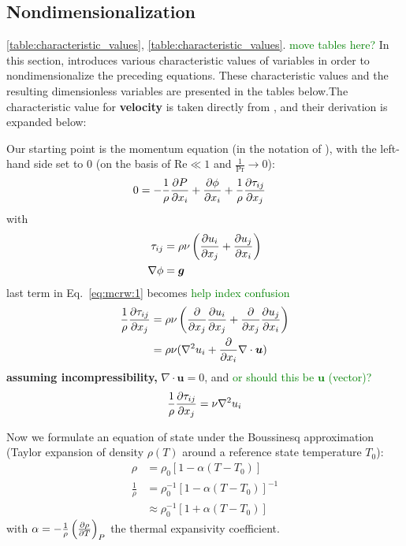 \documentclass[document.tex]{subfiles}
\begin{document}
\subsection{Nondimensionalization}
\ref{table:characteristic_values}, \ref{table:characteristic_values}. \textcolor{green}{move tables here?}
In this section, \cite{jamc80} introduces various characteristic values of variables in order to nondimensionalize the preceding equations. These characteristic values and the resulting dimensionless 
variables are presented in the tables below.The characteristic value for \textbf{velocity} is taken directly from \cite{mcrw74}, and their derivation is expanded below: 

\begin{mdframed} 
    Our starting point is the momentum equation (in the notation of \cite{mcrw74}), with the left-hand side set to 0 (on the basis of $\mathrm{Re} \ll 1$ and $\frac{1}{\mathrm{Pr}}\to 0$):
    \begin{align} \label{eq:mcrw:1}
        0 &= -\frac{1}{\rho} \pdv{P}{x_i} + \pdv{\phi}{x_i} + \frac{1}{\rho}\pdv{\tau_{ij}}{x_j}
    \end{align}
    with 
    \begin{align*}
        \tau_{ij} &= \rho \nu\left(\pdv{u_i}{x_j} + \pdv{u_j}{x_i}\right) \\
        \nabla\phi &= \bm{g}
    \end{align*}
    last term in Eq.~\eqref{eq:mcrw:1} becomes \textcolor{green}{help index confusion}
    \begin{align*}
        \frac{1}{\rho}\pdv{\tau_{ij}}{x_j} &= \rho \nu \left(\pdv{x_j}\pdv{u_i}{x_j}+\pdv{x_j}\pdv{u_j}{x_i}\right) \\
        &= \rho \nu (\nabla^2u_i+ \pdv{x_i}\nabla \cdot \bm{u}) \\
    \end{align*}
    \textbf{assuming incompressibility,} $\nabla \cdot \bm{u} = 0$, and \textcolor{green}{or should this be $\bm{u}$ (vector)?}
    \begin{align} 
        \frac{1}{\rho}\pdv{\tau_{ij}}{x_j} = \nu \nabla^2 u_i
    \end{align}

    Now we formulate an equation of state under the Boussinesq approximation (Taylor expansion of density $\rho(T)$ around a reference state temperature $T_0$): 
    \begin{align*}
        \rho &= \rho_0[1-\alpha (T-T_0)] \\
        \frac{1}{\rho} &= \rho_0^{-1}[1-\alpha (T-T_0)]^{-1} \\
        &\approx \rho_0^{-1}[1+\alpha (T-T_0)]
    \end{align*}
    with $\alpha = -\frac{1}{\rho}\left(\pdv{\rho}{T}\right)_P$ the thermal expansivity coefficient. 


\end{mdframed}
\end{document}
